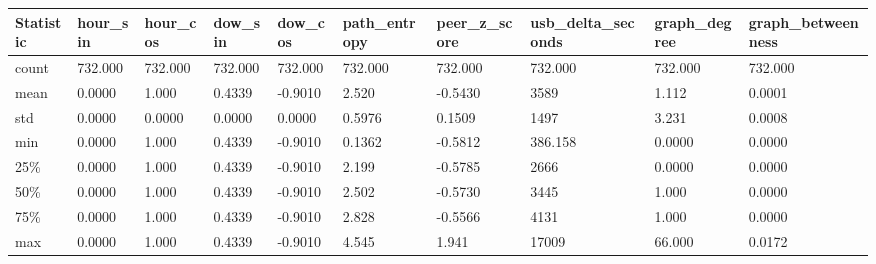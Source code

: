\begin{tabular}{llllllllll}
\toprule
Statistic & hour\_sin & hour\_cos & dow\_sin & dow\_cos & path\_entropy & peer\_z\_score & usb\_delta\_seconds & graph\_degree & graph\_betweenness \\
\midrule
count & 732.000 & 732.000 & 732.000 & 732.000 & 732.000 & 732.000 & 732.000 & 732.000 & 732.000 \\
mean & 0.0000 & 1.000 & 0.4339 & -0.9010 & 2.520 & -0.5430 & 3589 & 1.112 & 0.0001 \\
std & 0.0000 & 0.0000 & 0.0000 & 0.0000 & 0.5976 & 0.1509 & 1497 & 3.231 & 0.0008 \\
min & 0.0000 & 1.000 & 0.4339 & -0.9010 & 0.1362 & -0.5812 & 386.158 & 0.0000 & 0.0000 \\
25\% & 0.0000 & 1.000 & 0.4339 & -0.9010 & 2.199 & -0.5785 & 2666 & 0.0000 & 0.0000 \\
50\% & 0.0000 & 1.000 & 0.4339 & -0.9010 & 2.502 & -0.5730 & 3445 & 1.000 & 0.0000 \\
75\% & 0.0000 & 1.000 & 0.4339 & -0.9010 & 2.828 & -0.5566 & 4131 & 1.000 & 0.0000 \\
max & 0.0000 & 1.000 & 0.4339 & -0.9010 & 4.545 & 1.941 & 17009 & 66.000 & 0.0172 \\
\bottomrule
\end{tabular}